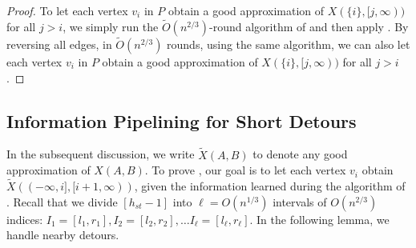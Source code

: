 \begin{proof}
To let each vertex $v_i$ in $P$ obtain a good approximation of $X(\{i\}, [j, \infty))$ for all $j > i$, we simply run the $\widetilde{O}(n^{2/3})$-round algorithm of  and then apply . By reversing all edges, in $\widetilde{O}(n^{2/3})$ rounds, using the same algorithm, we can also let each vertex $v_i$ in $P$ obtain a good approximation of $X(\{i\}, [j, \infty))$ for all $j > i$.
\end{proof}

\subsection{Information Pipelining for Short Detours}\label{subsect:near}


In the subsequent discussion, we write $\widetilde{X}(A,B)$ to denote any good approximation of $X(A,B)$.
To prove , our goal is to let each vertex $v_i$ obtain $\widetilde{X}((-\infty,i], [i+1, \infty))$, given the information learned during the algorithm of . Recall that we divide $[h_{st}-1]$ into $\ell =O(n^{1/3})$ intervals of $O(n^{2/3})$ indices: $I_1=[l_1,r_1], I_2=[l_2,r_2], \ldots  I_\ell=[l_\ell,r_\ell]$. In the following lemma, we handle nearby detours.

